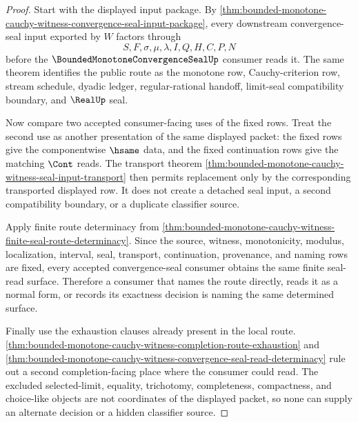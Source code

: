 \begin{proof}
Start with the displayed input package. By \autoref{thm:bounded-monotone-cauchy-witness-convergence-seal-input-package}, every downstream convergence-seal input exported by $W$ factors through
$$
S,F,\sigma,\mu,\lambda,I,Q,H,C,P,N
$$
before the $\BoundedMonotoneConvergenceSealUp$ consumer reads it. The same theorem identifies the public route as the monotone row, Cauchy-criterion row, stream schedule, dyadic ledger, regular-rational handoff, limit-seal compatibility boundary, and $\RealUp$ seal.

Now compare two accepted consumer-facing uses of the fixed rows. Treat the second use as another presentation of the same displayed packet: the fixed rows give the componentwise $\hsame$ data, and the fixed continuation rows give the matching $\Cont$ reads. The transport theorem \autoref{thm:bounded-monotone-cauchy-witness-seal-input-transport} then permits replacement only by the corresponding transported displayed row. It does not create a detached seal input, a second compatibility boundary, or a duplicate classifier source.

Apply finite route determinacy from \autoref{thm:bounded-monotone-cauchy-witness-finite-seal-route-determinacy}. Since the source, witness, monotonicity, modulus, localization, interval, seal, transport, continuation, provenance, and naming rows are fixed, every accepted convergence-seal consumer obtains the same finite seal-read surface. Therefore a consumer that names the route directly, reads it as a normal form, or records its exactness decision is naming the same determined surface.

Finally use the exhaustion clauses already present in the local route. \autoref{thm:bounded-monotone-cauchy-witness-completion-route-exhaustion} and \autoref{thm:bounded-monotone-cauchy-witness-convergence-seal-read-determinacy} rule out a second completion-facing place where the consumer could read. The excluded selected-limit, equality, trichotomy, completeness, compactness, and choice-like objects are not coordinates of the displayed packet, so none can supply an alternate decision or a hidden classifier source.
\end{proof}
